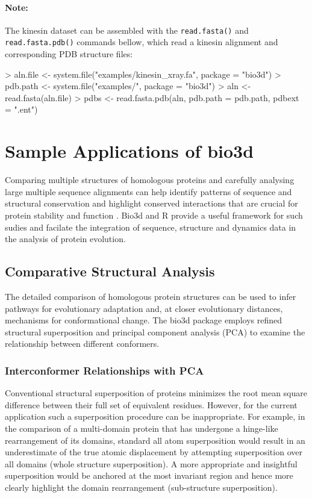 \documentclass[a4paper]{article}
\begin{document}
\paragraph{Note:}The kinesin dataset can be assembled with the \texttt{read.fasta()} and \texttt{read.fasta.pdb()} commands bellow, which read a kinesin alignment and corresponding PDB structure files:

\begin{Schunk}
\begin{Sinput}
> aln.file <- system.file("examples/kinesin_xray.fa", package = "bio3d")
> pdb.path <- system.file("examples/", package = "bio3d")
> aln <- read.fasta(aln.file)
> pdbs <- read.fasta.pdb(aln, pdb.path = pdb.path, pdbext = ".ent")
\end{Sinput}
\end{Schunk}




\section{Sample Applications of bio3d}
Comparing multiple structures of homologous proteins and carefully analysing large multiple sequence alignments can help identify patterns of sequence and structural conservation and highlight conserved interactions that are crucial for protein stability and function \citep{grant07}.  Bio3d and R provide a useful framework for such sudies and facilate the integration of sequence, structure and dynamics data in the analysis of protein evolution.


\subsection{Comparative Structural Analysis}
The detailed comparison of homologous protein structures can be used to infer pathways for evolutionary adaptation and, at closer evolutionary distances, mechanisms for conformational change. The bio3d package employs refined structural superposition and principal component analysis (PCA) to examine the relationship between different conformers. 

\subsubsection{Interconformer Relationships with PCA}
Conventional structural superposition of proteins minimizes the root mean square difference between their full set of equivalent residues. However, for the current application such a superposition procedure can be inappropriate. For example, in the comparison of a multi-domain protein that has undergone a hinge-like rearrangement of its domains, standard all atom superposition would result in an underestimate of the true atomic displacement by attempting superposition over all domains (whole structure superposition). A more appropriate and insightful superposition would be anchored at the most invariant region and hence more clearly highlight the domain rearrangement (sub-structure superposition). 
\end{document}
